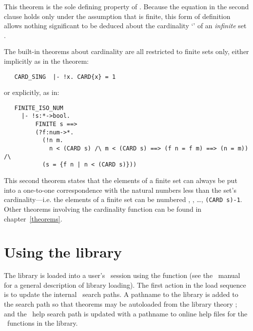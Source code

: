 \noindent This theorem is the sole defining property of .  Because the
equation in the second clause holds only under the assumption that  is
finite, this form of definition allows nothing significant to be deduced about
the cardinality `' of an {\it infinite\/} set .

The built-in theorems about cardinality are all restricted to finite sets only,
either implicitly as in the theorem:

\begin{hol}
\begin{verbatim}
   CARD_SING  |- !x. CARD{x} = 1
\end{verbatim}\end{hol}

\noindent or explicitly, as in:

\begin{hol}
\begin{verbatim}
   FINITE_ISO_NUM
     |- !s:*->bool.
         FINITE s ==>
         (?f:num->*.
           (!n m.
             n < (CARD s) /\ m < (CARD s) ==> (f n = f m) ==> (n = m)) /\
           (s = {f n | n < (CARD s)}))
\end{verbatim}\end{hol}

\noindent This second theorem states that the elements of a finite set can
always be put into a one-to-one correspondence with the natural numbers less
than the set's cardinality---i.e. the elements of a finite set \ml{s} can be
numbered \ml{0}, \ml{1}, \dots, {\small\verb!(CARD s)-1!}.  Other theorems
involving the cardinality function \ml{CARD} can be found in
chapter~\ref{theorems}.

\section{Using the library}\label{using}

The  library is loaded into a user's \HOL\ session using the
function \ml{load\_library} (see the \HOL\ manual for a general description of
library loading).  The first action in the load sequence is to update the
internal \HOL\ search paths.  A pathname to the library is added to the search
path so that theorems may be autoloaded from the library theory
; and the \HOL\ help search path is updated with a pathname to
online help files for the \ML\ functions in the library.

